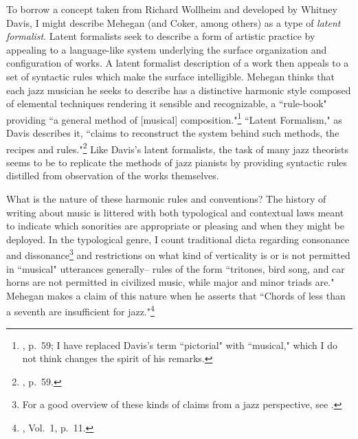 To borrow a concept taken from Richard Wollheim and developed by Whitney Davis, I might describe Mehegan (and Coker, among others) as a type of \emph{latent formalist}.  Latent formalists seek to describe a form of artistic practice by appealing to a language-like system underlying the surface organization and configuration of works.  A latent formalist description of a work then appeals to a set of syntactic rules which make the surface intelligible.  Mehegan thinks that each jazz musician he seeks to describe has a distinctive harmonic style composed of elemental techniques rendering it sensible and recognizable, a ``rule-book" providing ``a general method of [musical] composition."\footnote{\cite{davis2011}, p.\ 59; I have replaced Davis's term ``pictorial" with ``musical," which I do not think changes the spirit of his remarks.}  ``Latent Formalism," as Davis describes it, ``claims to reconstruct the system behind such methods, the recipes and rules."\footnote{\cite{davis2011}, p.\ 59.}  Like Davis's latent formalists, the task of many jazz theorists seems to be to replicate the methods of jazz pianists by providing syntactic rules distilled from observation of the works themselves.

What is the nature of these harmonic rules and conventions?  The history of writing about music is littered with both typological and contextual laws meant to indicate which sonorities are appropriate or pleasing and when they might be deployed.  In the typological genre, I count traditional dicta regarding consonance and dissonance\footnote{For a good overview of these kinds of claims from a jazz perspective, see \cite{mcgowan2008}.} and restrictions on what kind of verticality is or is not permitted in ``musical" utterances generally-- rules of the form ``tritones, bird song, and car horns are not permitted in civilized music, while major and minor triads are."  Mehegan makes a claim of this nature when he asserts that ``Chords of less than a seventh are insufficient for jazz."\footnote{\cite{mehegan1959}, Vol.\ 1, p.\ 11.}

